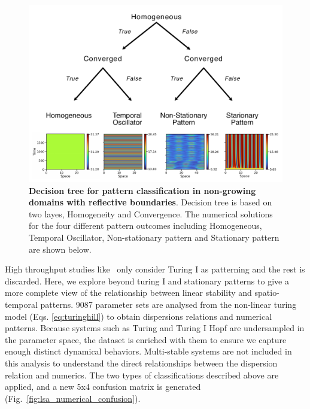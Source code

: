 \begin{figure}[H] %
    \centering
    \begin{adjustbox}{center}
    \includegraphics[width=1.2\textwidth]{chapters/Chapter 1/no growth classification} %
    \end{adjustbox}
    \caption{\textbf{Decision tree for pattern classification in non-growing domains with reflective boundaries}. Decision tree is based on two layes, Homogeneity and Convergence. The numerical solutions for the four different pattern outcomes including Homogeneous, Temporal Oscillator, Non-stationary pattern and Stationary pattern are shown below.}
    \label{fig:no growth classification} %
\end{figure}


High throughput studies like~\cite{Scholes2019, Zheng2016, Marcon} only consider Turing I as patterning and the rest is discarded.
Here, we explore beyond turing I and stationary patterns to give a more complete view of the relationship between linear stability and spatio-temporal patterns.
9087 parameter sets are analysed from the non-linear turing model (Eqs. \ref{eq:turinghill}) to obtain dispersions relations and numerical patterns.
Because systems such as Turing and Turing I Hopf are undersampled in the parameter space, the dataset is enriched with them to ensure we capture enough distinct dynamical behaviors.
Multi-stable systems are not included in this analysis to understand the direct relationships between the dispersion relation and numerics.
The two types of classifications described above are applied, and a new 5x4 confusion matrix is generated (Fig.~\ref{fig:lsa_numerical_confusion}).

